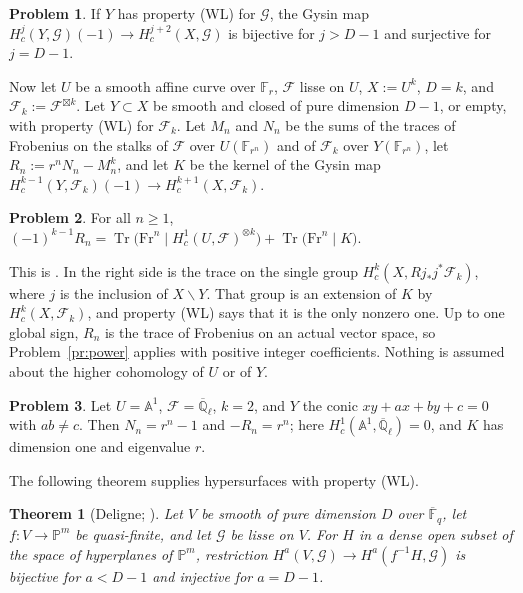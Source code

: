 \documentclass[reqno]{amsart}
\theoremstyle{definition}
\newtheorem{problem}{Problem}[section]
\theoremstyle{plain}
\newtheorem{theorem}{Theorem}[section]
\newcommand{\Q}{\mathbb{Q}}
\newcommand{\F}{\mathbb{F}}
\newcommand{\A}{\mathbb{A}}
\newcommand{\Fb}{\overline{\F}_q}
\newcommand{\Ql}{\overline{\Q}_\ell}
\newcommand{\cF}{\mathcal{F}}
\newcommand{\cG}{\mathcal{G}}
\newcommand{\Fr}{\mathrm{Fr}}
\newcommand{\Tr}{\operatorname{Tr}}
\begin{document}
\begin{problem}\label{pr:gysin}
If \(Y\) has property (WL) for \(\cG\), the Gysin map \(H^j_c(Y, \cG)(-1) \to H^{j+2}_c(X, \cG)\) is bijective for \(j > D - 1\) and surjective for \(j = D - 1\).
\end{problem}

Now let \(U\) be a smooth affine curve over \(\F_r\), \(\cF\) lisse on \(U\), \(X := U^k\), \(D = k\), and \(\cF_k := \cF^{\boxtimes k}\).  Let \(Y \subset X\) be smooth and closed of pure dimension \(D - 1\), or empty, with property (WL) for \(\cF_k\).  Let \(M_n\) and \(N_n\) be the sums of the traces of Frobenius on the stalks of \(\cF\) over \(U(\F_{r^n})\) and of \(\cF_k\) over \(Y(\F_{r^n})\), let \(R_n := r^nN_n - M_n^k\), and let \(K\) be the kernel of the Gysin map \(H^{k-1}_c(Y, \cF_k)(-1) \to H^{k+1}_c(X, \cF_k)\).

\begin{problem}\label{pr:prop4}
For all \(n \ge 1\),
\(
  (-1)^{k-1} R_n = \Tr\bigl(\Fr^n \mid H^1_c(U, \cF)^{\otimes k}\bigr) + \Tr\bigl(\Fr^n \mid K\bigr).
\)
\end{problem}

This is \cite[Proposition~4]{Ald}.  In \cite[Lemma~2.2 and Definition~2.3]{Zh} the right side is the trace on the single group \(H^k_c(X, Rj_*j^*\cF_k)\), where \(j\) is the inclusion of \(X \smallsetminus Y\).  That group is an extension of \(K\) by \(H^k_c(X, \cF_k)\), and property (WL) says that it is the only nonzero one.  Up to one global sign, \(R_n\) is the trace of Frobenius on an actual vector space, so Problem~\ref{pr:power} applies with positive integer coefficients.  Nothing is assumed about the higher cohomology of \(U\) or of \(Y\).

\begin{problem}\label{pr:conic}
Let \(U = \A^1\), \(\cF = \Ql\), \(k = 2\), and \(Y\) the conic \(xy + ax + by + c = 0\) with \(ab \ne c\).  Then \(N_n = r^n - 1\) and \(-R_n = r^n\); here \(H^1_c(\A^1, \Ql) = 0\), and \(K\) has dimension one and eigenvalue \(r\).
\end{problem}

The following theorem supplies hypersurfaces with property (WL).

\begin{theorem}[{Deligne; \cite[Appendix, Corollary~A.5]{Kat93}}]\label{th:wl}
Let \(V\) be smooth of pure dimension \(D\) over \(\Fb\), let \(f \colon V \to \mathbb{P}^m\) be quasi-finite, and let \(\cG\) be lisse on \(V\).  For \(H\) in a dense open subset of the space of hyperplanes of \(\mathbb{P}^m\), restriction \(H^a(V, \cG) \to H^a(f^{-1}H, \cG)\) is bijective for \(a < D - 1\) and injective for \(a = D - 1\).
\end{theorem}
\end{document}

